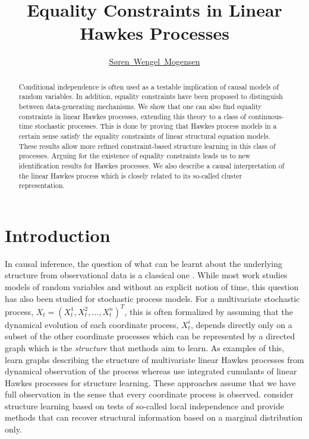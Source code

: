 \documentclass[accepted]{uai2021} %
\title{Equality Constraints in Linear Hawkes 
Processes}
\author[1]{\href{mailto: Søren Wengel Mogensen 
<soren.wengel_mogensen@control.lth.se>}{Søren~Wengel~Mogensen}{}}
\affil[1]{%
    Department of Automatic Control\\
    Lund University\\
    Sweden
}
\begin{document}
\maketitle

\begin{abstract}
Conditional independence is often used as a testable 
implication of causal models of random variables. In addition, equality 
constraints have been proposed to distinguish between data-generating 
mechanisms. We show that one 
can also find equality constraints in linear Hawkes processes, 
extending this theory to a class of continuous-time stochastic processes. This 
is done by proving that Hawkes process models in a certain sense satisfy the 
equality 
constraints 
of linear structural equation models. These results
allow more refined constraint-based structure learning in this class of 
processes. Arguing for the existence of equality constraints leads us to 
new 
identification 
results for Hawkes processes. We also describe a causal interpretation of the 
linear 
Hawkes process which is closely 
related to its so-called cluster representation.

\end{abstract}


\section{Introduction}\label{sec:intro}

In causal inference, the question of what can be learnt about the underlying 
structure from observational data is a classical one 
\citep{spirtes1993,pearl2009}. While most work 
studies models of random variables and without an explicit notion of time, this 
question has also been 
studied for stochastic process models. For a multivariate stochastic 
process, $X_t = (X_t^1, X_t^2, \ldots, X_t^n)^T$, this is often formalized by 
assuming that the dynamical evolution of each coordinate process, $X_t^i$,   
depends directly only on a subset of the other coordinate processes which can 
be 
represented by a directed graph which is the \emph{structure} that methods 
aim to learn. As examples of this, \cite{eichlerHawkes2017, xu2016} learn
graphs describing the structure of multivariate linear Hawkes processes from 
dynamical observation of the process whereas 
\cite{achab2017} use integrated cumulants of 
linear Hawkes processes for structure learning. 
These approaches assume that we have full observation in the sense that every 
coordinate 
process is observed. \cite{meek2014, mogensenUAI2018, mogensenUAI2020} consider 
structure learning based on tests of so-called local independence and provide 
methods 
that can recover structural information based on a marginal distribution only. 
\end{document}

